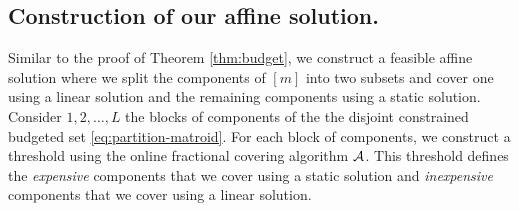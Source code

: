 \documentclass[moor]{informs1}              %
\begin{document}
\subsection{Construction of our affine solution.}

Similar to the proof of Theorem \ref{thm:budget}, we construct a feasible affine solution where we split the components of $[m]$ into two subsets and cover one using a linear solution and the remaining components  using a static solution. Consider $1,2,\ldots,L$ the blocks of components of the the disjoint constrained budgeted set \eqref{eq:partition-matroid}. For each block of components, we construct a threshold using the online fractional covering  algorithm $\cal A$. This threshold defines the  {\em expensive } components that we cover using a static solution and {\em inexpensive} components that we cover using a linear solution.
\end{document}
